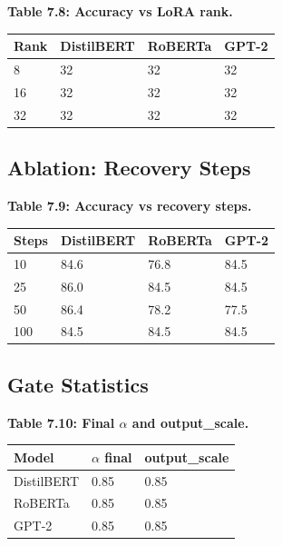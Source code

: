 \textbf{Table 7.8: Accuracy vs LoRA rank.}

\begin{table}[H]
\centering
\small
\begin{tabular}{llll}
\toprule
\textbf{Rank} & \textbf{DistilBERT} & \textbf{RoBERTa} & \textbf{GPT-2} \\
\midrule
8 & 32 & 32 & 32 \\
16 & 32 & 32 & 32 \\
32 & 32 & 32 & 32 \\
\bottomrule
\end{tabular}
\end{table}

\subsection{Ablation: Recovery Steps}

\textbf{Table 7.9: Accuracy vs recovery steps.}

\begin{table}[H]
\centering
\small
\begin{tabular}{llll}
\toprule
\textbf{Steps} & \textbf{DistilBERT} & \textbf{RoBERTa} & \textbf{GPT-2} \\
\midrule
10 & 84.6 & 76.8 & 84.5 \\
25 & 86.0 & 84.5 & 84.5 \\
50 & 86.4 & 78.2 & 77.5 \\
100 & 84.5 & 84.5 & 84.5 \\
\bottomrule
\end{tabular}
\end{table}

\subsection{Gate Statistics}

\textbf{Table 7.10: Final $\alpha$ and output\_scale.}

\begin{table}[H]
\centering
\small
\begin{tabular}{lll}
\toprule
\textbf{Model} & \textbf{$\alpha$ final} & \textbf{output\_scale} \\
\midrule
DistilBERT & 0.85 & 0.85 \\
RoBERTa & 0.85 & 0.85 \\
GPT-2 & 0.85 & 0.85 \\
\bottomrule
\end{tabular}
\end{table}

